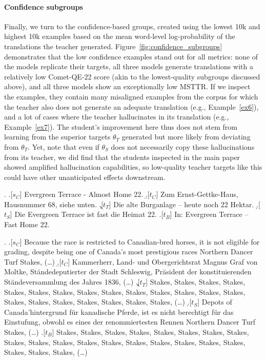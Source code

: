 \paragraph{Confidence subgroups}
Finally, we turn to the confidence-based groups, created using the lowest 10k and highest 10k examples based on the mean word-level log-probability of the translations the teacher generated. Figure~\ref{fig:confidence_subgroups} demonstrates that the low confidence examples stand out for all metrics: none of the models replicate their targets, all three models generate translations with a relatively low Comet-QE-22 score (akin to the lowest-quality subgroups discussed above), and all three models show an exceptionally low MSTTR. If we inspect the examples, they contain many misaligned examples from the corpus for which the teacher also does not generate an adequate translation (e.g., Example~\ref{ex6}), and a lot of cases where the teacher hallucinates in its translation (e.g., Example~\ref{ex7}). The student's improvement here thus does not stem from learning from the superior targets $\theta_T$ generated but more likely from deviating from $\theta_T$. Yet, note that even if $\theta_S$ does not necessarily copy these hallucinations from its teacher, we did find that the students inspected in the main paper showed amplified hallucination capabilities, so low-quality teacher targets like this could have other unanticipated effects downstream.

{\small
\setlength{\Extopsep}{0.5em}
\setlength{\Exlabelsep}{0.75em}
\setlength{\Exlabelwidth}{.75em}
\setlength{\SubExleftmargin}{1.2em}

\ex. \label{ex6}
\a.[$s_C$] Evergreen Terrace - Almost Home 22.
\b.[$t_C$] Zum Ernst-Gettke-Haus, Hausnummer 68, siehe unten.
\c.[$t_T$] Die alte Burganlage – heute noch 22 Hektar.
\d.[$t_S$] Die Evergreen Terrace ist fast die Heimat 22.
\e.[$t_B$] In: Evergreen Terrace – Fast Home 22.

\ex. \label{ex7}
\a.[$s_C$] Because the race is restricted to Canadian-bred horses, it is not eligible for grading, despite being one of Canada's most prestigious races Northern Dancer Turf Stakes, (\dots)
\b.[$t_C$] Kammerherr, Land- und Obergerichtsrat Magnus Graf von Moltke, Ständedeputierter der Stadt Schleswig, Präsident der konstituierenden Ständeversammlung des Jahres 1836, (\dots)
\c.[$t_T$] Stakes, Stakes, Stakes, Stakes, Stakes, Stakes, Stakes, Stakes, Stakes, Stakes, Stakes, Stakes, Stakes, Stakes, Stakes, Stakes, Stakes, Stakes, Stakes, Stakes, Stakes, (\dots)
\d.[$t_S$] Depots of Canada'hintergrund für kanadische Pferde, ist es nicht berechtigt für das Einstufung, obwohl es eines der renommiertesten Rennen Northern Dancer Turf Stakes, (\dots)
\e.[$t_B$] Stakes, Stakes, Stakes, Stakes, Stakes, Stakes, Stakes, Stakes, Stakes, Stakes, Stakes, Stakes, Stakes, Stakes, Stakes, Stakes, Stakes, Stakes, Stakes, Stakes, Stakes, (\dots)

}


